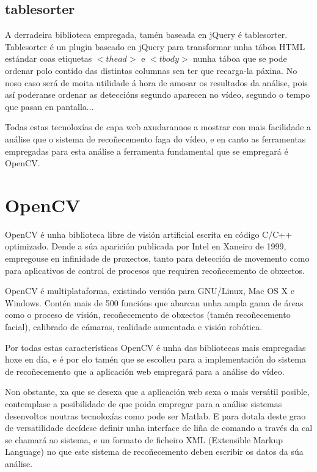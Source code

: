         \subsection{tablesorter}
        
            A derradeira biblioteca empregada, tamén baseada en jQuery é tablesorter. Tablesorter é 
            un plugin baseado en jQuery para transformar unha táboa HTML estándar coas etiquetas
            $<thead>$ e $<tbody>$ nunha táboa que se pode ordenar polo contido das distintas 
            columnas sen ter que recarga-la páxina. No noso caso será de moita utilidade á hora de 
            amosar os resultados da análise, pois así poderanse ordenar as deteccións segundo 
            aparecen no vídeo, segundo o tempo que pasan en pantalla... 
        
    Todas estas tecnoloxías de capa web axudarannos a mostrar con mais facilidade a análise que o
    sistema de recoñecemento faga do vídeo, e en canto as ferramentas empregadas para esta análise
    a ferramenta fundamental que se empregará é OpenCV.
    
\section{OpenCV}
    
    OpenCV é unha biblioteca libre de visión artificial escrita en código C/C++ optimizado.
    Dende a súa aparición publicada por Intel en Xaneiro de 1999, empregouse en infinidade 
    de proxectos, tanto para detección de movemento como para aplicativos de control de procesos
    que requiren recoñecemento de obxectos.
    
    OpenCV é multiplataforma, existindo versión para GNU/Linux, Mac OS X e Windows. Contén mais 
    de 500 funcións que abarcan unha ampla gama de áreas como o proceso de visión, recoñecemento
    de obxectos (tamén recoñecemento facial), calibrado de cámaras, realidade aumentada e visión
    robótica.
    
    Por todas estas características OpenCV é unha das bibliotecas mais empregadas hoxe en día, e é
    por elo tamén que se escolleu para a implementación do sistema de recoñecemento que a aplicación
    web empregará para a análise do vídeo.
    
    Non obstante, xa que se desexa que a aplicación web sexa o mais versátil posible, contemplase a
    posibilidade de que poida empregar para a análise sistemas desenvoltos noutras tecnoloxías como
    pode ser Matlab. E para dotala deste grao de versatilidade decídese definir unha interface de
    liña de comando a través da cal se chamará ao sistema, e un formato de ficheiro XML (Extensible 
    Markup Language) no que este sistema de recoñecemento deben escribir os datos da súa análise.
        
